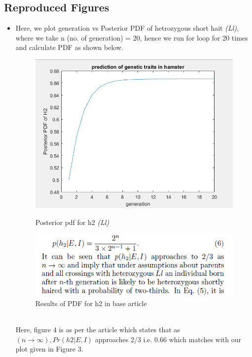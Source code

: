 \documentclass{article}
\begin{document}
\subsection{Reproduced Figures}
\begin{itemize}
\item Here, we plot generation vs Posterior PDF of hetrozygous short hait \textit{(Ll)}, where we take n (no. of generation) = 20, hence we run for loop for 20 times and calculate PDF as shown below.\\
\begin{figure}[h]
	
	\begin{minipage}[b]{0.32\textwidth}
		\includegraphics[width=1.5\textwidth]{code1}
		\caption{Posterior pdf for h2 \textit{(Ll)}}
	\end{minipage}%
	\hspace{3.5cm}
	\begin{minipage}[b]{0.32\textwidth}
		\includegraphics[width=1.5\textwidth]{compare}
		\caption{Results of PDF for h2 in base article}
	\end{minipage}%
	
	
	
\end{figure}\\
Here, figure 4 is as per the article which states that as $ (n\rightarrow \infty),  Pr(h2|E,I) $ approaches 2/3 i.e. 0.66 which matches with our plot given in Figure 3.
\end{itemize}
\end{document}
